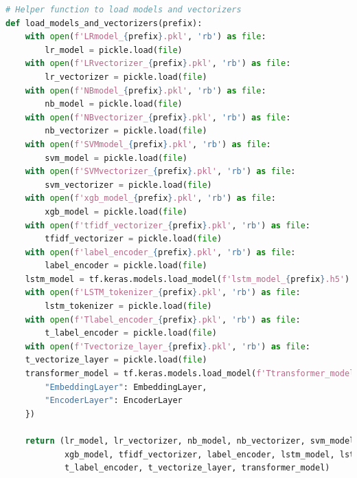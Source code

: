 \begin{tcolorbox}[colback=gray!5!white, colframe=gray!80!black, boxrule=0.5pt, title=Hierarchical Ensemble Model 1] 
    \begin{lstlisting}[language=Python]
# Helper function to load models and vectorizers
def load_models_and_vectorizers(prefix):
    with open(f'LRmodel_{prefix}.pkl', 'rb') as file:
        lr_model = pickle.load(file)
    with open(f'LRvectorizer_{prefix}.pkl', 'rb') as file:
        lr_vectorizer = pickle.load(file)
    with open(f'NBmodel_{prefix}.pkl', 'rb') as file:
        nb_model = pickle.load(file)
    with open(f'NBvectorizer_{prefix}.pkl', 'rb') as file:
        nb_vectorizer = pickle.load(file)
    with open(f'SVMmodel_{prefix}.pkl', 'rb') as file:
        svm_model = pickle.load(file)
    with open(f'SVMvectorizer_{prefix}.pkl', 'rb') as file:
        svm_vectorizer = pickle.load(file)
    with open(f'xgb_model_{prefix}.pkl', 'rb') as file:
        xgb_model = pickle.load(file)
    with open(f'tfidf_vectorizer_{prefix}.pkl', 'rb') as file:
        tfidf_vectorizer = pickle.load(file)
    with open(f'label_encoder_{prefix}.pkl', 'rb') as file:
        label_encoder = pickle.load(file)
    lstm_model = tf.keras.models.load_model(f'lstm_model_{prefix}.h5')
    with open(f'LSTM_tokenizer_{prefix}.pkl', 'rb') as file:
        lstm_tokenizer = pickle.load(file)
    with open(f'Tlabel_encoder_{prefix}.pkl', 'rb') as file:
        t_label_encoder = pickle.load(file)
    with open(f'Tvectorize_layer_{prefix}.pkl', 'rb') as file:
    t_vectorize_layer = pickle.load(file)
    transformer_model = tf.keras.models.load_model(f'Ttransformer_model_{prefix}.h5', custom_objects={
        "EmbeddingLayer": EmbeddingLayer,
        "EncoderLayer": EncoderLayer
    })

    return (lr_model, lr_vectorizer, nb_model, nb_vectorizer, svm_model, svm_vectorizer,
            xgb_model, tfidf_vectorizer, label_encoder, lstm_model, lstm_tokenizer,
            t_label_encoder, t_vectorize_layer, transformer_model)
    \end{lstlisting}
    \end{tcolorbox}
